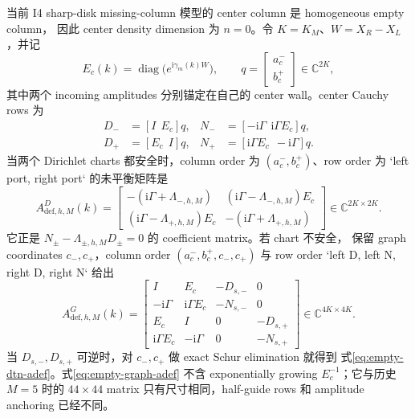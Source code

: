 \documentclass[UTF8,fontset=fandol,11pt,a4paper]{ctexart}
\newcommand{\ii}{\mathrm{i}}
\begin{document}
当前 I4 sharp-disk missing-column 模型的 center column 是 homogeneous empty column，
因此 center density dimension 为 $n=0$。令 $K=K_M$、$W=X_R-X_L$，并记
\[
  E_c(k)=\operatorname{diag}
  \bigl(e^{\ii\gamma_m(k)W}\bigr),
  \qquad
  q=\begin{bmatrix}a_c^-\\b_c^+\end{bmatrix}
  \in\mathbb C^{2K},
\]
其中两个 incoming amplitudes 分别锚定在自己的 center wall。center Cauchy rows 为
\[
\begin{aligned}
  D_-&=[I\ \ E_c]q,&
  N_-&=[-\ii\Gamma\ \ \ii\Gamma E_c]q,\\
  D_+&=[E_c\ \ I]q,&
  N_+&=[\ii\Gamma E_c\ \ -\ii\Gamma]q.
\end{aligned}
\]
当两个 Dirichlet charts 都安全时，column order 为 $(a_c^-,b_c^+)$、row order 为
`left port, right port` 的未平衡矩阵是
\begin{equation}
  A_{\mathrm{def},h,M}^{D}(k)=
  \begin{bmatrix}
    -(\ii\Gamma+\Lambda_{-,h,M})
    &(\ii\Gamma-\Lambda_{-,h,M})E_c\\
    (\ii\Gamma-\Lambda_{+,h,M})E_c
    &-(\ii\Gamma+\Lambda_{+,h,M})
  \end{bmatrix}
  \in\mathbb C^{2K\times2K}.
  \label{eq:empty-dtn-adef}
\end{equation}
它正是 $N_\pm-\Lambda_{\pm,h,M}D_\pm=0$ 的 coefficient matrix。若 chart 不安全，
保留 graph coordinates $c_-,c_+$，column order
$(a_c^-,b_c^+,c_-,c_+)$ 与 row order `left D, left N, right D, right N` 给出
\begin{equation}
  A_{\mathrm{def},h,M}^{G}(k)=
  \begin{bmatrix}
    I&E_c&-D_{s,-}&0\\
    -\ii\Gamma&\ii\Gamma E_c&-N_{s,-}&0\\
    E_c&I&0&-D_{s,+}\\
    \ii\Gamma E_c&-\ii\Gamma&0&-N_{s,+}
  \end{bmatrix}
  \in\mathbb C^{4K\times4K}.
  \label{eq:empty-graph-adef}
\end{equation}
当 $D_{s,-},D_{s,+}$ 可逆时，对 $c_-,c_+$ 做 exact Schur elimination 就得到
式\eqref{eq:empty-dtn-adef}。式\eqref{eq:empty-graph-adef} 不含 exponentially growing
$E_c^{-1}$；它与历史 $M=5$ 时的 $44\times44$ matrix 只有尺寸相同，half-guide rows
和 amplitude anchoring 已经不同。
\end{document}
